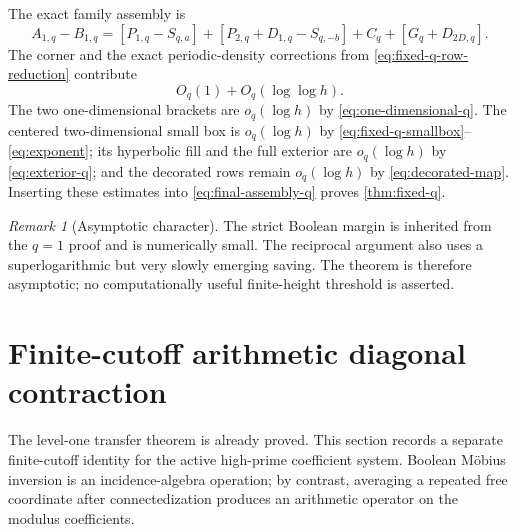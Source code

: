 \documentclass[11pt]{article}
\theoremstyle{definition}
\theoremstyle{remark}
\newtheorem{remark}[theorem]{Remark}
\newcommand{\1}{\mathbf 1}
\begin{document}
The exact family assembly is
\begin{equation}\label{eq:final-assembly-q}
\boxed{
A_{1,q}-B_{1,q}
=[P_{1,q}-S_{q,a}]
+[P_{2,q}+D_{1,q}-S_{q,-b}]
+C_q+[G_q+D_{2D,q}].
}
\end{equation}
The corner and the exact periodic-density corrections from
\eqref{eq:fixed-q-row-reduction} contribute
\[
O_q(1)+O_q(\log\log h).
\]
The two one-dimensional brackets are $o_q(\log h)$ by \eqref{eq:one-dimensional-q}.  The centered two-dimensional small box is $o_q(\log h)$ by \eqref{eq:fixed-q-smallbox}--\eqref{eq:exponent}; its hyperbolic fill and the full exterior are $o_q(\log h)$ by \eqref{eq:exterior-q}; and the decorated rows remain $o_q(\log h)$ by \eqref{eq:decorated-map}.  Inserting these estimates into \eqref{eq:final-assembly-q} proves \cref{thm:fixed-q}.

\begin{remark}[Asymptotic character]\label{rem:asymptotic}
The strict Boolean margin is inherited from the $q=1$ proof and is numerically small.  The reciprocal argument also uses a superlogarithmic but very slowly emerging saving.  The theorem is therefore asymptotic; no computationally useful finite-height threshold is asserted.
\end{remark}

\section{Finite-cutoff arithmetic diagonal contraction}\label{sec:collision}

The level-one transfer theorem is already proved.  This section records a separate finite-cutoff identity for the active high-prime coefficient system.  Boolean M\"obius inversion is an incidence-algebra operation; by contrast, averaging a repeated free coordinate after connectedization produces an arithmetic operator on the modulus coefficients.
\end{document}
